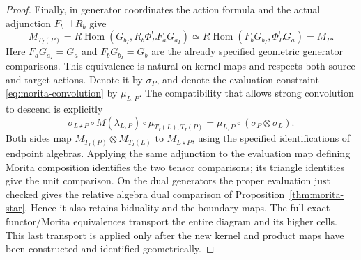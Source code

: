 \documentclass[11pt]{article}
\theoremstyle{definition}
\theoremstyle{remark}
\newcommand{\RHom}{R\operatorname{Hom}}
\begin{document}
\begin{proof}
Finally, in generator coordinates the action formula and the actual
adjunction $F_b\dashv R_b$ give
\[
 M_{T_I(P)}
 =\RHom(G_{b_I},R_b\Phi_P^!F_aG_{a_I})
 \simeq\RHom(F_bG_{b_I},\Phi_P^!G_a)=M_P.
\]
Here $F_aG_{a_I}=G_a$ and $F_bG_{b_I}=G_b$ are the already specified
geometric generator comparisons.  This equivalence is natural on
kernel maps and respects both source and target actions.  Denote
it by $\sigma_P$, and denote the evaluation constraint
\eqref{eq:morita-convolution} by $\mu_{L,P}$.  The compatibility that
allows strong convolution to descend is explicitly
\begin{equation}
 \sigma_{L\star P}\circ M(\lambda_{L,P})\circ
                 \mu_{T_I(L),T_I(P)}
   =\mu_{L,P}\circ(\sigma_P\otimes\sigma_L).
 \label{eq:morita-descent-square}
\end{equation}
Both sides map $M_{T_I(P)}\otimes M_{T_I(L)}$ to $M_{L\star P}$,
using the specified identifications of endpoint algebras.
Applying
the same adjunction to the evaluation map defining Morita composition
identifies the two tensor comparisons; its triangle identities give
the unit comparison.  On the dual generators the proper evaluation
just checked gives the relative algebra dual comparison of
Proposition~\ref{thm:morita-star}.  Hence it also retains biduality and
the boundary maps.  The full exact-functor/Morita equivalences
transport the entire diagram and its higher cells.  This last
transport is applied only after the new kernel and product maps
have been constructed and identified geometrically.
\end{proof}
\end{document}
